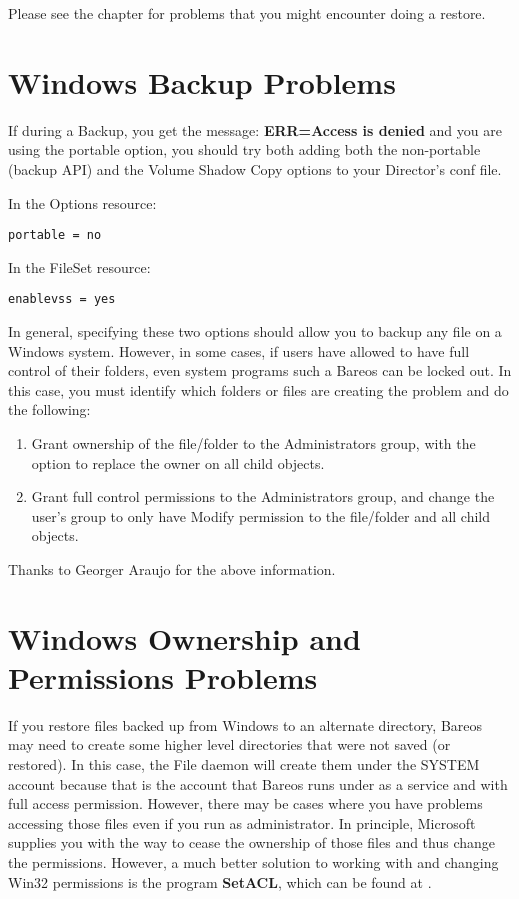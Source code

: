 Please see the  chapter for problems
that you might encounter doing a restore.

\section{Windows Backup Problems}

If during a Backup, you get the message:
{\bf ERR=Access is denied} and you are using the portable option,
you should try both adding both the non-portable (backup API) and
the Volume Shadow Copy options to your Director's conf file.

In the Options resource:
\footnotesize
\begin{verbatim}
portable = no
\end{verbatim}
\normalsize

In the FileSet resource:
\footnotesize
\begin{verbatim}
enablevss = yes
\end{verbatim}
\normalsize

In general, specifying these two options should allow you to backup
any file on a Windows system.  However, in some cases, if users
have allowed to have full control of their folders, even system programs
such a Bareos can be locked out.  In this case, you must identify
which folders or files are creating the problem and do the following:

\begin{enumerate}
\item Grant ownership of the file/folder to the Administrators group,
with the option to replace the owner on all child objects.
\item Grant full control permissions to the Administrators group,
and change the user's group to only have Modify permission to
the file/folder and all child objects.
\end{enumerate}

Thanks to Georger Araujo for the above information.

\section{Windows Ownership and Permissions Problems}

If you restore files backed up from Windows to an alternate directory,
Bareos may need to create some higher level directories that were not saved
(or restored). In this case, the File daemon will create them under the SYSTEM
account because that is the account that Bareos runs under as a service and with full access permission.
However, there may be cases where you have problems accessing those files even
if you run as administrator. In principle, Microsoft supplies you with the way
to cease the ownership of those files and thus change the permissions.
However, a much better solution to working with and changing Win32 permissions
is the program {\bf SetACL}, which can be found at
.

